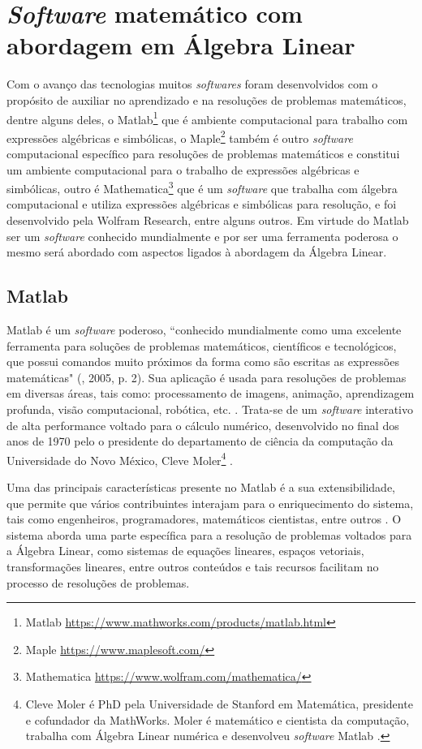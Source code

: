 \section{\textit{Software} matemático com abordagem em Álgebra Linear}
\noindent Com o avanço das tecnologias muitos \textit{softwares} foram desenvolvidos com o propósito de auxiliar no aprendizado e na resoluções de problemas matemáticos, dentre alguns deles, o  Matlab\footnote[2]{Matlab \url{https://www.mathworks.com/products/matlab.html}} que é ambiente computacional para trabalho com expressões algébricas e simbólicas, o Maple\footnote[3]{Maple \url{https://www.maplesoft.com/}} também é outro \textit{software} computacional específico para resoluções de problemas matemáticos e constitui um ambiente computacional para o trabalho de expressões algébricas e simbólicas, outro é Mathematica\footnote[4]{Mathematica \url{https://www.wolfram.com/mathematica/}} que é um \textit{software} que trabalha com álgebra computacional e utiliza expressões algébricas e simbólicas para resolução, e foi desenvolvido pela Wolfram Research, entre alguns outros. Em virtude do Matlab ser um \textit{software} conhecido mundialmente e por ser uma ferramenta poderosa o mesmo será abordado com aspectos ligados à abordagem da Álgebra Linear.

\subsection{Matlab}
\noindent Matlab é um \textit{software} poderoso, ``conhecido mundialmente como uma excelente ferramenta para soluções de problemas matemáticos, científicos e tecnológicos, que possui comandos muito próximos da forma como são escritas as expressões matemáticas"  (\cite{2005:Marcello}, 2005, p. 2). Sua aplicação é usada para resoluções de problemas em diversas áreas, tais como: processamento de imagens, animação, aprendizagem profunda, visão computacional, robótica, etc. \cite{2004:Wu}. Trata-se de um \textit{software} interativo de alta performance voltado para o cálculo numérico, desenvolvido no final dos anos de 1970 pelo o presidente do departamento de ciência da computação da Universidade do Novo México, Cleve Moler\footnote[1]{Cleve Moler é PhD pela Universidade de Stanford em Matemática, presidente e cofundador da MathWorks. Moler é matemático e cientista da computação, trabalha com Álgebra Linear numérica e desenvolveu \textit{software} Matlab \cite{2016:Raquel}.} \cite{2016:Raquel}.

Uma das principais características presente no Matlab é a sua extensibilidade, que permite que vários contribuintes interajam  para o enriquecimento do sistema, tais como engenheiros, programadores, matemáticos cientistas, entre outros \cite{2005:Marcello}. O sistema aborda uma parte específica para a resolução de problemas voltados para a Álgebra Linear, como sistemas de equações lineares, espaços vetoriais, transformações lineares, entre outros conteúdos e tais recursos facilitam no processo de resoluções de problemas.

